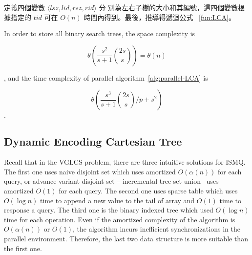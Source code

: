 定義四個變數
$\langle\mathit{lsz},\mathit{lid},\mathit{rsz},\mathit{rid}\rangle$ 分
別為左右子樹的大小和其編號，這四個變數根據指定的 $\mathit{tid}$ 可在
$O(n)$ 時間內得到。最後，推導得遞迴公式 ~\ref{fun:LCA}。  \fi



In order to store all binary search trees, the space complexity is 

\begin{equation}
\theta\left(\frac{s^2}{s+1} \binom{2s}{s}\right) = \theta\left(n\right)
\end{equation}

, and the time complexity of parallel algorithm~\ref{alg:parallel-LCA}
is

\begin{equation}
\theta\left(\frac{s^3}{s+1} \binom{2s}{s} \bigg/ p + s^2 \right)
\end{equation}.

\iffalse

為記錄所有的二元搜尋樹的 LCA，空間消耗 $\theta\left(\frac{s^2}{s+1}
\binom{2s}{s}\right) = \theta\left(n\right)$；其平行算法
\ref{alg:parallel-LCA} 的時間複雜度如下：

\begin{equation}
\theta\left(\frac{s^3}{s+1} \binom{2s}{s} \bigg/ p + s^2 \right)
\end{equation}.
\fi



\subsection{Dynamic Encoding Cartesian Tree}

Recall that in the VGLCS problem, there are three intuitive solutions
for ISMQ.  The first one uses naive disjoint set which uses amortized
$O(\alpha(n))$ for each query, or advance variant disjoint set --
incremental tree set union~\cite{Gabow1983ALA} uses amortized $O(1)$
for each query.  The second one uses sparse table which uses $O(\log
n)$ time to append a new value to the tail of array and $O(1)$ time to
response a query.  The third one is the binary indexed tree which used
$O(\log n)$ time for each operation.  Even if the amortized complexity
of the algorithm is $O(\alpha(n))$ or $O(1)$, the algorithm incurs
inefficient synchronizations in the parallel environment. Therefore,
the last two data structure is more suitable than the first one.

